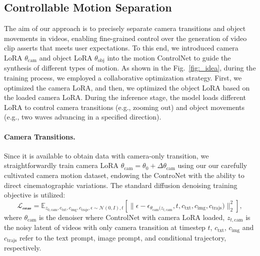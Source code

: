 \documentclass{article} %
\begin{document}
\subsection{Controllable Motion Separation}
\label{Sec:3.4}
The aim of our approach is to precisely separate camera transitions and object movements in videos, enabling fine-grained control over the generation of video clip asserts that meets user expectations. To this end, we introduced camera LoRA  $\theta_\text{cam}$  and object LoRA $\theta_\text{obj}$  into the motion ControlNet to guide the synthesis of different types of motion. 
As shown in the Fig.~\ref{fig:_idea}, during the training process, we employed a collaborative optimization strategy. First, we optimized the camera LoRA, and then, we optimized the object LoRA based on the loaded camera LoRA. During the inference stage, the model loads different LoRA to control camera transitions (e.g., zooming out) and object movements (e.g., two waves advancing in a specified direction).

\paragraph{Camera Transitions.}
Since it is available to obtain data with camera-only transition, we straightforwardly train camera LoRA $\theta_\text{cam} = \theta_0 + \Delta\theta_\text{cam}$ using our our carefully cultivated camera motion dataset, endowing the ControNet with the ability to direct cinematographic variations. The standard diffusion denoising training objective is utilized:
\begin{equation}
  \mathcal{L_\text{cam}} = \mathbb{E}_{z_{0,\text{cam}}, c_\text{txt}, c_\text{img}, c_\text{trajs}, \epsilon\sim\mathcal{N}(0, \mathit{I}), t} \left\lbrack
  \lVert \epsilon - \epsilon_{\theta_\text{cam}(z_{t,\text{cam}}}, t, c_\text{txt}, c_\text{img}, c_\text{trajs}) \rVert_2^2 \right\rbrack,
  \label{euqation: noise_preditcion_loss_cam}
\end{equation}
where $\theta_\text{cam}$ is the denoiser where ControlNet with camera LoRA loaded,  $z_{t,\text{cam}}$ is the noisy latent of videos with only camera transition at timestep $t$, $c_\text{txt}$, $c_\text{img}$ and $c_\text{trajs}$ refer to the text prompt, image prompt, and conditional trajectory, respectively.
\end{document}
